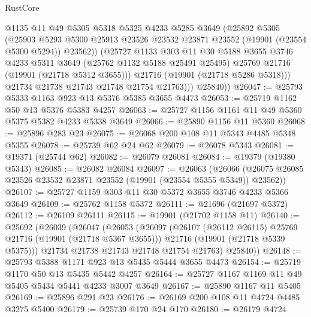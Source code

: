 \begin{lexlean}{RustCore}
\begin{coremodule}
                @1135
                @11
                @49
                @5305
                @5318
                @5325
                @4233
                @5285
                @3649
                (@25892
                  @5305
                  (@25903
                    @5293
                    @5300
                    @25913
                    @23526
                    @23532
                    @23871
                    @23552
                    (@19901 (@23554 @5300 @5294))
                    @23562))
                (@25727
                  @1133
                  @303
                  @11
                  @30
                  @5188
                  @3655
                  @3746
                  @4233
                  @5311
                  @3649
                  (@25762 @1132 @5188 @25491 @25495)
                  @25769
                  @21716
                  (@19901 (@21718 @5312 @3655)))
                @21716
                (@19901 (@21718 @5286 @5318)))
              @21734
              @21738
              @21743
              @21748
              @21754
              @21763)))
        @25840))
@26047 := @25793 @5333 @1163 @923 @13 @5376 @5385 @3655 @4473
@26053 := @25719 @1162 @50 @13 @5376 @5383 @4257
@26063 := @25727 @1156 @1161 @11 @49 @5360 @5375 @5382 @4233 @5338 @3649
@26066 := @25890 @1156 @11 @5360
@26068 := @25896 @283 @23
@26075 := @26068 @200 @108 @11 @5343 @4485 @5348 @5355
@26078 := @25739 @62 @24 @62
@26079 := @26078 @5343
@26081 := @19371 (@25744 @62)
@26082 := @26079 @26081
@26084 := @19379 (@19380 @5343)
@26085 := @26082 @26084
@26097 := @26063
    (@26066 (@26075 @26085 @23526 @23532 @23871 @23552 (@19901 (@23554 @5355 @5349)) @23562))
@26107 := @25727 @1159 @303 @11 @30 @5372 @3655 @3746 @4233 @5366 @3649
@26109 := @25762 @1158 @5372
@26111 := @21696 (@21697 @5372)
@26112 := @26109 @26111
@26115 := @19901 (@21702 @1158 @11)
@26140 := @25692
    (@26039
      (@26047
        (@26053
          (@26097
            (@26107 (@26112 @26115) @25769 @21716 (@19901 (@21718 @5367 @3655)))
            @21716
            (@19901 (@21718 @5339 @5375)))
          @21734
          @21738
          @21743
          @21748
          @21754
          @21763)
        @25840))
@26148 := @25793 @5388 @1171 @923 @13 @5435 @5444 @3655 @4473
@26154 := @25719 @1170 @50 @13 @5435 @5442 @4257
@26164 := @25727 @1167 @1169 @11 @49 @5405 @5434 @5441 @4233 @3007 @3649
@26167 := @25890 @1167 @11 @5405
@26169 := @25896 @291 @23
@26176 := @26169 @200 @108 @11 @4724 @4485 @3275 @5400
@26179 := @25739 @170 @24 @170
@26180 := @26179 @4724

\end{coremodule}
\end{lexlean}
